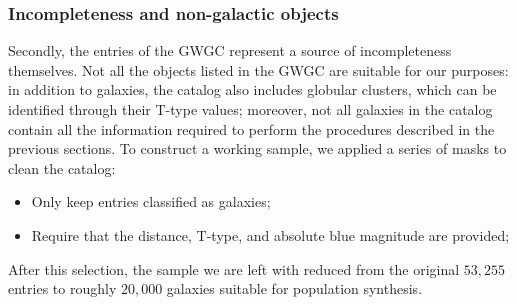 \subsubsection{Incompleteness and non-galactic objects}
Secondly, the entries of the GWGC represent a source of incompleteness themselves. 
Not all the objects listed in the GWGC are suitable for our purposes:
in addition to galaxies, the catalog also includes globular clusters, which can be identified through their T-type values; 
moreover, not all galaxies in the catalog contain all the information required to perform the procedures described in the previous sections.
To construct a working sample, we applied a series of masks to clean the catalog:
\begin{itemize}
    \item Only keep entries classified as galaxies; 
    \item Require that the distance, T-type, and absolute blue magnitude are provided; 
\end{itemize}
After this selection, the sample we are left with reduced from the original $53,255$ entries to roughly $20,000$ galaxies suitable for population synthesis.

